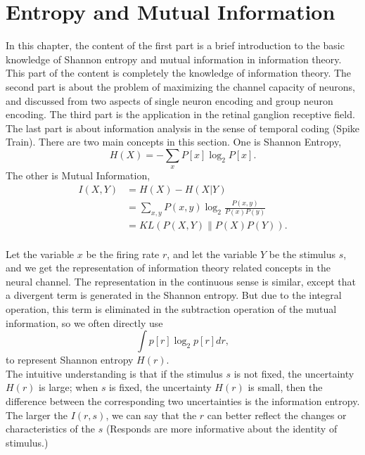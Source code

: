 \section{Entropy and Mutual Information}
\label{sec:Entropy and Mutual Information}
In this chapter, the content of the first part is a brief introduction
to the basic knowledge of Shannon entropy and mutual information in
information theory. This part of the content is completely the
knowledge of information theory. The second part is about the problem
of maximizing the channel capacity of neurons, and discussed from two
aspects of single neuron encoding and group neuron encoding. The third
part is the application in the retinal ganglion receptive field. The
last part is about information analysis in the sense of temporal
coding (Spike Train).
There are two main concepts in this section. One is Shannon Entropy,
\begin{equation}
  \label{equ:4.3}
  H(X)=-\sum_{x}P[x]\log_2P[x].
\end{equation}
The other is Mutual Information,
\begin{equation}
\begin{aligned}
  I(X,Y)&=H(X)-H(X|Y)\\
  &=\sum_{x,y}P(x,y)\log_2\frac{P(x,y)}{P(x)P(y)}\\
&=KL(P(X,Y)\|P(X)P(Y)).
\end{aligned}
\end{equation}\\
Let the variable $x$ be the firing rate $r$, and let the variable $Y$
be the stimulus $s$, and we get the representation of information
theory related concepts in the neural channel. The representation in
the continuous sense is similar, except that a divergent term is
generated in the Shannon entropy. But due to the integral operation,
this term is eliminated in the subtraction operation of the mutual
information, so we often directly use
\begin{equation}
  \int p[r]\log_2p[r]dr,
\end{equation}
to represent Shannon entropy $H(r)$.\\

The intuitive understanding is that if the stimulus $s$ is not fixed,
the uncertainty $H(r)$ is large; when $s$ is fixed, the uncertainty
$H(r)$ is small, then the difference between the corresponding two
uncertainties is the information entropy. The larger the $I(r,s)$, we
can say that the $r$ can better reflect the changes or characteristics
of the $s$ (Responds are more informative about the identity of
stimulus.)\\

